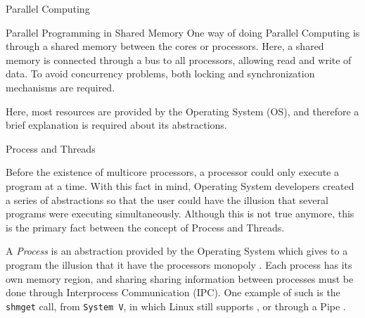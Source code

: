 \begin{section}{Parallel Computing}
\begin{subsection}{Parallel Programming in Shared Memory}
	One way of doing Parallel Computing is through a shared memory
	between the cores or processors. Here, a shared memory is connected
	through a bus to all processors, allowing read and write of data.
	To avoid concurrency problems, both locking and synchronization mechanisms
	are required.


	Here, most resources are provided by the Operating System (OS),
	and therefore a brief explanation is required about its abstractions.


\begin{subsubsection}{Process and Threads}

	Before the existence of multicore processors, a processor
	could only execute a program at a time. With this fact in
	mind, Operating System developers created a series of abstractions
	so that the user could have the illusion that several programs were
	executing simultaneously. Although this is not true anymore, this
	is the primary fact between the concept of Process and Threads.


	A \textit{Process} is an abstraction provided by the Operating System
	which gives to a program the illusion that it have the processors
	monopoly \citep{love:2005}. Each process has its own memory region, and
	sharing sharing information between processes must be done through
	Interprocess Communication (IPC). One example of such is the
	\texttt{shmget} call, from \texttt{System V}, in which Linux still
	supports \citep{shmget}, or through a Pipe \cite{pipe}.


\end{subsubsection}
\end{subsection}
\end{section}
